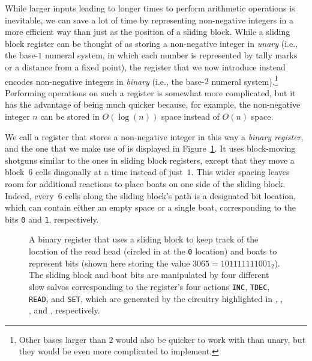 While larger inputs leading to longer times to perform arithmetic operations is inevitable, we can save a lot of time by representing non-negative integers in a more efficient way than just as the position of a sliding block. While a sliding block register can be thought of as storing a non-negative integer in \emph{unary} (i.e., the base-$1$ numeral system, in which each number is represented by tally marks or a distance from a fixed point), the register that we now introduce instead encodes non-negative integers in \emph{binary} (i.e., the base-$2$ numeral system).\footnote{Other bases larger than $2$ would also be quicker to work with than unary, but they would be even more complicated to implement.} Performing operations on such a register is somewhat more complicated, but it has the advantage of being much quicker because, for example, the non-negative integer $n$ can be stored in $O(\log(n))$ space instead of $O(n)$ space.

We call a register that stores a non-negative integer in this way a \emph{binary register}, and the one that we make use of is displayed in Figure~\ref{fig:binary_register}. It uses block-moving shotguns similar to the ones in sliding block registers, except that they move a block~$6$ cells diagonally at a time instead of just~$1$. This wider spacing leaves room for additional reactions to place boats on one side of the sliding block. Indeed, every~$6$ cells along the sliding block's path is a designated bit location, which can contain either an empty space or a single boat, corresponding to the bits \texttt{0} and \texttt{1}, respectively.

\begin{figure}[!htb]
	\centering
	\caption{A binary register that uses a sliding block to keep track of the location of the read head (circled in  at the \texttt{0} location) and boats to represent bits (shown here storing the value $3065 = 101111111001_2$). The sliding block and boat bits are manipulated by four different slow salvos corresponding to the register's four actions \texttt{INC}, \texttt{TDEC}, \texttt{READ}, and \texttt{SET}, which are generated by the circuitry highlighted in , , , and , respectively.}\label{fig:binary_register}
\end{figure}

